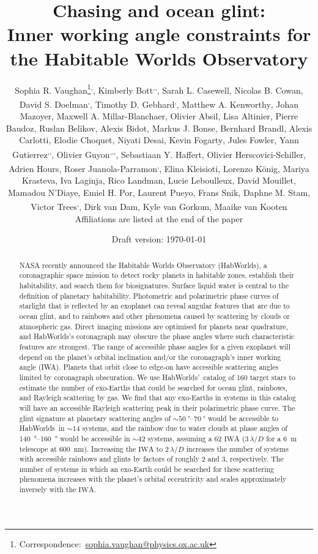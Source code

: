 \documentclass[
    usenatbib,
]{mnras}
\title{Chasing \rainbows{} and ocean glint:\\  Inner working angle constraints for the Habitable Worlds Observatory}
\author[Sophia R. Vaughan et al.]{%
    Sophia R. Vaughan\thanks{Correspondence:~\url{sophia.vaughan@physics.ox.ac.uk}}\textsuperscript{,\afflink{1}},
    Kimberly Bott\textsuperscript{\afflink{2},\afflink{3},\afflink{4}},
    Sarah L. Casewell\textsuperscript{\afflink{5}},
    Nicolas B. Cowan\textsuperscript{\afflink{6}},
    David S. Doelman\textsuperscript{\afflink{7},\afflink{8}},
    \newauthor
    Timothy D. Gebhard\textsuperscript{\afflink{9},\afflink{10}},
    Matthew A.  Kenworthy\textsuperscript{\afflink{7}},
    Johan Mazoyer\textsuperscript{\afflink{11}},
    Maxwell A. Millar-Blanchaer\textsuperscript{\afflink{12}},
    \newauthor
    Olivier Absil\textsuperscript{\afflink{13}},
    Lisa Altinier\textsuperscript{\afflink{14}},
    Pierre Baudoz\textsuperscript{\afflink{11}},
    Ruslan Belikov\textsuperscript{\afflink{15}},
    Alexis Bidot\textsuperscript{\afflink{16}},
    Markus J. Bonse\textsuperscript{\afflink{10}},
    \newauthor
    Bernhard Brandl\textsuperscript{\afflink{7}},
    Alexis Carlotti\textsuperscript{\afflink{16}},
    Elodie Choquet\textsuperscript{\afflink{14}},
    Niyati Desai\textsuperscript{\afflink{17}},
    Kevin Fogarty\textsuperscript{\afflink{15}},
    Jules Fowler\textsuperscript{\afflink{18}},
    \newauthor
    Yann Gutierrez\textsuperscript{\afflink{11},\afflink{19},\afflink{20}},
    Olivier Guyon\textsuperscript{\afflink{21},\afflink{22},\afflink{23},\afflink{24}},
    Sebastiaan Y. Haffert\textsuperscript{\afflink{21}},
    Olivier Herscovici-Schiller\textsuperscript{\afflink{19}},
    \newauthor
    Adrien Hours\textsuperscript{\afflink{16}},
    Roser Juanola-Parramon\textsuperscript{\afflink{25},\afflink{26}},
    Elina Kleisioti\textsuperscript{\afflink{7}},
    Lorenzo König\textsuperscript{\afflink{13}},
    Mariya Krasteva\textsuperscript{\afflink{27}},
    \newauthor
    Iva Laginja\textsuperscript{\afflink{11}},
    Rico Landman\textsuperscript{\afflink{7}},
    Lucie Leboulleux\textsuperscript{\afflink{16}},
    David Mouillet\textsuperscript{\afflink{16}},
    Mamadou N’Diaye\textsuperscript{\afflink{28}},
    \newauthor
    Emiel H. Por\textsuperscript{\afflink{29}},
    Laurent Pueyo\textsuperscript{\afflink{29}},
    Frans Snik\textsuperscript{\afflink{7}},
    Daphne M. Stam\textsuperscript{\afflink{30}},
    Victor Trees\textsuperscript{\afflink{31},\afflink{32}},
    Dirk van Dam\textsuperscript{\afflink{7}},
    \newauthor
    Kyle van Gorkom\textsuperscript{\afflink{21}},
    Maaike van Kooten\textsuperscript{\afflink{33}}
    \newauthor \\%
    Affiliations are listed at the end of the paper
}
\date{Draft version: \today}
\newcommand{\IWA}{\ensuremath{\mathrm{IWA}}}
\newcommand{\hwo}{HabWorlds}
\begin{document}
 

\maketitle

\begin{abstract}
NASA recently announced the Habitable Worlds Observatory (\hwo), a coronagraphic space mission to detect rocky planets in habitable zones, establish their habitability, and search them for biosignatures. 
Surface liquid water is central to the definition of planetary habitability.
%
Photometric and polarimetric phase curves of starlight that is reflected by an exoplanet can reveal angular features that are due to ocean glint, and to rainbows and other phenomena caused by scattering by clouds or atmospheric gas.
%
Direct imaging missions are optimised for planets near quadrature, and \hwo's coronagraph may obscure the phase angles where such characteristic features are strongest. 
%
The range of accessible phase angles for a given exoplanet will depend on the planet's orbital inclination and/or the coronagraph's inner working angle (IWA). 
%
Planets that orbit close to edge-on have accessible scattering angles limited by coronagraph obscuration. 
%
We use \hwo'~catalog of 160 target stars to estimate the number of exo-Earths that could be searched for ocean glint, rainbows, and Rayleigh scattering by gas. 
%
We find that any exo-Earths in systems in this catalog will have an accessible Rayleigh scattering peak in their polarimetric phase curve. 
%
The glint signature at planetary scattering angles of $\sim\qtyrange{50}{70}{\degree}$ 
would be accessible to \hwo~in $\sim\num{14}$ systems, and the rainbow due to water clouds at phase angles of \qtyrange{140}{160}{\degree} would be accessible in $\sim\num{42}$ systems, assuming a \qty{62}{\mas} \IWA{} ($3\,\lambda/D$ for a \qty{6}{\meter} telescope at \qty{600}{\nano\meter}).
%
Increasing the \IWA{} to $2\,\lambda/D$ increases the number of systems with accessible rainbows and glints by factors of roughly 2 and 3, respectively.
%
The number of systems in which an exo-Earth could be searched for these scattering phenomena increases with the planet's orbital eccentricity and scales approximately inversely with the \IWA{}.  \end{abstract}
\end{document}

